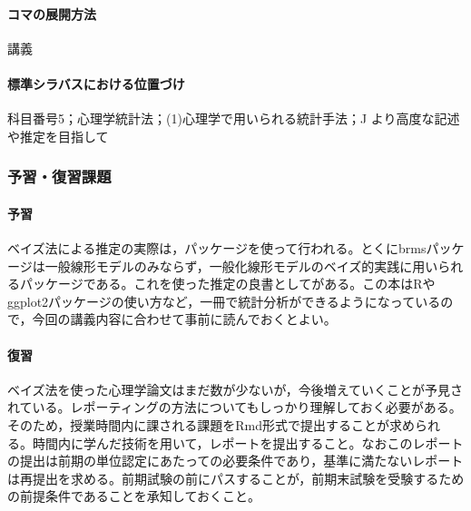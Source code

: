 \paragraph{コマの展開方法}
講義
\paragraph{標準シラバスにおける位置づけ}
科目番号5；心理学統計法；(1)心理学で用いられる統計手法；J より高度な記述や推定を目指して
\subsubsection{予習・復習課題}
\paragraph{予習}
ベイズ法による推定の実際は，パッケージを使って行われる。とくにbrmsパッケージは一般線形モデルのみならず，一般化線形モデルのベイズ的実践に用いられるパッケージである。これを使った推定の良書として\textcite{Baba201907}がある。この本はRやggplot2パッケージの使い方など，一冊で統計分析ができるようになっているので，今回の講義内容に合わせて事前に読んでおくとよい。
\paragraph{復習}
ベイズ法を使った心理学論文はまだ数が少ないが，今後増えていくことが予見されている。レポーティングの方法についてもしっかり理解しておく必要がある。そのため，授業時間内に課される課題をRmd形式で提出することが求められる。時間内に学んだ技術を用いて，レポートを提出すること。なおこのレポートの提出は前期の単位認定にあたっての必要条件であり，基準に満たないレポートは再提出を求める。前期試験の前にパスすることが，前期末試験を受験するための前提条件であることを承知しておくこと。

